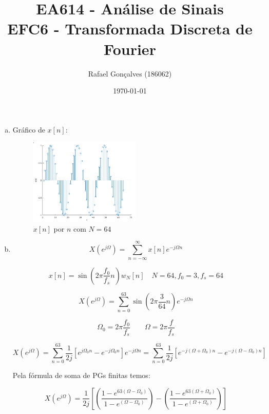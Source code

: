 \documentclass{article}
\begin{document}
\title{EA614 - Análise de Sinais \\
\large{EFC6 - Transformada Discreta de Fourier}}
\author{Rafael Gonçalves (186062)}
\date{\today}

\maketitle

\begin{enumerate}[(a)]
\item

    Gráfico de $x[n]$:

\begin{figure}[H]
\centering
\includegraphics[width=0.5\textwidth]{images/xn.png}
    \caption{$x[n]$ por $n$ com $N = 64$}
\end{figure}

\item

    \[
    X(e^{j\Omega}) = \sum\limits_{n = -\infty}^{\infty} x[n] e^{-j\Omega n}
\]

        \[
    x[n] = \sin(2\pi\frac{f_0}{f_s}n)w_N[n] \quad  N = 64,  f_0 = 3,  f_s = 64
\]

        \[
    X(e^{j\Omega}) = \sum\limits_{n = 0}^{63} \sin(2\pi\frac{3}{64}n) e^{-j\Omega n}
\]

        \[
            \Omega_0 = 2 \pi \frac{ f_0 }{f_s} \quad\quad
            \Omega = 2 \pi \frac{ f }{f_s}
        \]

        \[
            X(e^{j\Omega}) = \sum\limits_{n = 0}^{63} \frac{1}{2j}[e^{j \Omega_0 n} - e^{-j \Omega_0 n}] e^{-j\Omega n} = \sum\limits_{n = 0}^{63} \frac{1}{2j}[e^{-j (\Omega + \Omega_0)  n } - e^{-j (\Omega - \Omega_0) n}]
        \]

        Pela fórmula de soma de PGs finitas temos:

        \[
            \boxed{
            X(e^{j\Omega}) = \frac{1}{2j}\left [ \left ( \frac{1 - e^{63(\Omega - \Omega_0)}}{1 - e^{(\Omega - \Omega_0)}} \right ) - \left ( \frac{1 - e^{63(\Omega + \Omega_0)}}{1 - e^{(\Omega + \Omega_0)}} \right ) \right ]
            }
        \]


\end{enumerate}
\end{document}
